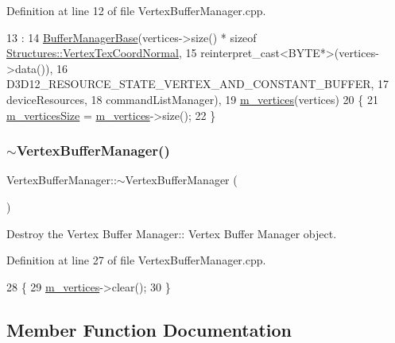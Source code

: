 Definition at line 12 of file Vertex\+Buffer\+Manager.\+cpp.


\begin{DoxyCode}
13                                                                 :
14     \mbox{\hyperlink{class_buffer_manager_base_a9cec2f80ae72dc972ef6d18ab075ab6c}{BufferManagerBase}}(vertices->size() * \textcolor{keyword}{sizeof} 
      \mbox{\hyperlink{struct_structures_1_1_vertex_tex_coord_normal}{Structures::VertexTexCoordNormal}},
15         \textcolor{keyword}{reinterpret\_cast<}BYTE*\textcolor{keyword}{>}(vertices->data()),
16         D3D12\_RESOURCE\_STATE\_VERTEX\_AND\_CONSTANT\_BUFFER,
17         deviceResources,
18         commandListManager),
19     \mbox{\hyperlink{class_vertex_buffer_manager_adbeb6371c5b6dbd5f2adb57273ee342a}{m\_vertices}}(vertices)
20 \{
21     \mbox{\hyperlink{class_vertex_buffer_manager_a9d499437ec6b54fd97f27a106b0d424a}{m\_verticesSize}} = \mbox{\hyperlink{class_vertex_buffer_manager_adbeb6371c5b6dbd5f2adb57273ee342a}{m\_vertices}}->size();
22 \}
\end{DoxyCode}
\mbox{\label{class_vertex_buffer_manager_aa3ff5c3b6cfc0dbe797bb1d953c62616}} 
\subsubsection{\texorpdfstring{$\sim$\+Vertex\+Buffer\+Manager()}{~VertexBufferManager()}}
{\footnotesize\ttfamily Vertex\+Buffer\+Manager\+::$\sim$\+Vertex\+Buffer\+Manager (\begin{DoxyParamCaption}{ }\end{DoxyParamCaption})}



Destroy the Vertex Buffer Manager\+:\+: Vertex Buffer Manager object. 



Definition at line 27 of file Vertex\+Buffer\+Manager.\+cpp.


\begin{DoxyCode}
28 \{
29     \mbox{\hyperlink{class_vertex_buffer_manager_adbeb6371c5b6dbd5f2adb57273ee342a}{m\_vertices}}->clear();
30 \}
\end{DoxyCode}


\subsection{Member Function Documentation}
\mbox{\label{class_vertex_buffer_manager_a164fa0bdbc01ab468792626bd9f9d109}} 
